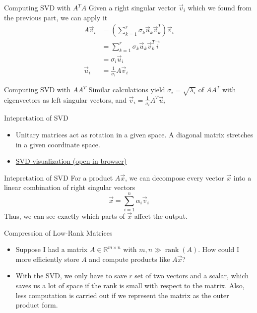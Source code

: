     \begin{frame}{Computing SVD with $A^T A$}
		Given a right singular vector $\vec{v}_i$ which we found from the previous part, we can apply it
		\begin{align*}
			A \vec{v}_i &= \left( \sum_{k = 1}^r \sigma_k \vec{u}_k \vec{v}_k^T \right) \vec{v}_i \\
			&= \sum_{k = 1}^r \sigma_k \vec{u}_k \vec{v}_k^T \vec{i} \\
			&= \sigma_i \vec{u}_i \\
			\vec{u}_i &= \frac{1}{\sigma_i} A \vec{v}_i
		\end{align*}
    \end{frame}

    \begin{frame}{Computing SVD with $A A^T$}
        Similar calculations yield $\sigma_i = \sqrt{\lambda_i}$ of $A A^T$ with eigenvectors as left singular vectors, and $\vec{v}_i = \frac{1}{\sigma_i} A^T \vec{u}_i$
    \end{frame}

    \begin{frame}{Intepretation of SVD}
    \begin{itemize}
    	\item Unitary matrices act as rotation in a given space. A diagonal matrix stretches in a given coordinate space.
    	
    	\item \href{https://en.wikipedia.org/wiki/File:Singular_value_decomposition.gif}{SVD visualization (open in browser)}
    \end{itemize}

    \end{frame}

    \begin{frame}{Intepretation of SVD}
		For a product $A \vec{x}$, we can decompose every vector $\vec{x}$ into a linear combination of right singular vectors
		\[ \vec x = \sum_{i = 1}^n \alpha_i \vec{v}_i \]
		Thus, we can see exactly which parts of $\vec{x}$ affect the output.
    \end{frame}

	\begin{frame}{Compression of Low-Rank Matrices}
	\begin{itemize}[<+->]
	\item Suppose I had a matrix $A \in \mathbb{R}^{m \times n}$ with $m, n \gg \operatorname{rank}(A)$. How could I more efficiently store $A$ and compute products like $A \vec{x}$?
	\vspace{2em}
	\item With the SVD, we only have to save $r$ set of two vectors and a scalar, which saves us a lot of space if the rank is small with respect to the matrix. Also, less computation is carried out if we represent the matrix as the outer product form.
	\end{itemize}
	\end{frame}

